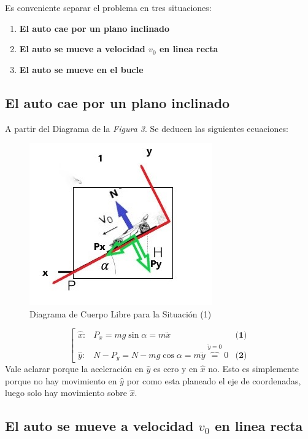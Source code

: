 \documentclass[fleqn,10pt]{SelfArx} %
\begin{document}
Es conveniente separar el problema en tres situaciones:
\begin{enumerate}
	\item \textbf{El auto cae por un plano inclinado}
	\item \textbf{El auto se mueve a velocidad $v_0$ en linea recta}
	\item \textbf{El auto se mueve en el bucle}
\end{enumerate}

\subsection*{El auto cae por un plano inclinado}

A partir del Diagrama de la \textit{Figura 3}. Se deducen las siguientes
ecuaciones:
\begin{figure}[h] 
	\centering
	\includegraphics[scale=0.6]{figuras/diag1.jpg}
	\caption{Diagrama de Cuerpo Libre para la Situación (1)}
	\label{fig:3}
\end{figure}
\[\left[ \begin{array}{lll}
 \hat{x}: & P_x = m g \sin{\alpha} = m \ddot{x} & \textbf{(1)}\\
 \hat{y}: &N - P_y = N - m g \cos{\alpha} = m \ddot{y} \overbrace{=}^{\ddot{y}=0} 0 & \textbf{(2)}
\end{array} \right.
\]
Vale aclarar porque la aceleración en $\hat{y}$ es cero y en $\hat{x}$ no. Esto es simplemente porque no hay movimiento en $\hat{y}$ por como esta planeado el eje de coordenadas, luego solo hay movimiento sobre $\hat{x}$.

\subsection*{El auto se mueve a velocidad $v_0$ en linea recta}
\end{document}
